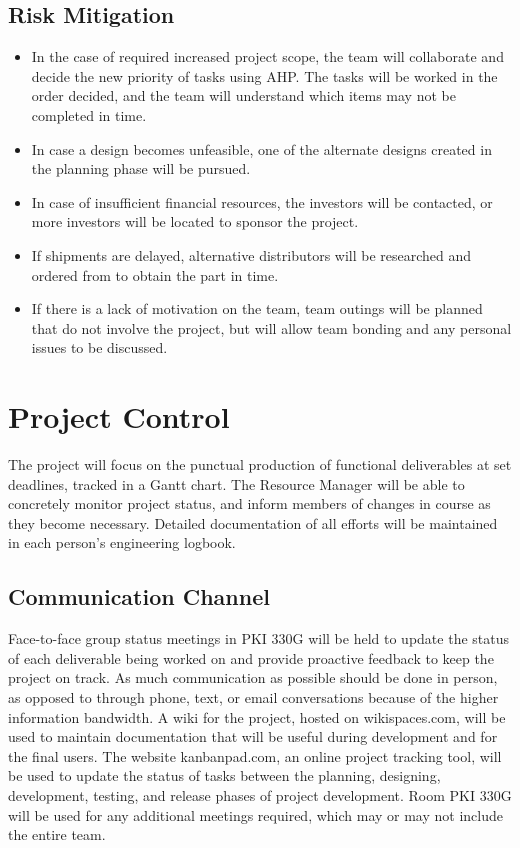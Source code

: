 \subsection{Risk Mitigation}
\begin{itemize}
	\item In the case of required increased project scope, the team will collaborate and decide the new priority of tasks using AHP. The tasks will be worked in the order decided, and the team will understand which items may not be completed in time.
	\item In case a design becomes unfeasible, one of the alternate designs created in the planning phase will be pursued.
	\item In case of insufficient financial resources, the investors will be contacted, or more investors will be located to sponsor the project.
	\item If shipments are delayed, alternative distributors will be researched and ordered from to obtain the part in time.
	\item If there is a lack of motivation on the team, team outings will be planned that do not involve the project, but will allow team bonding and any personal issues to be discussed.
\end{itemize}

\section{Project Control}
The project will focus on the punctual production of functional deliverables at set deadlines, tracked in a Gantt chart.
The Resource Manager will be able to concretely monitor project status, and inform members of changes in course as they become necessary.
Detailed documentation of all efforts will be maintained in each person's engineering logbook.

\subsection{Communication Channel}
Face-to-face group status meetings in PKI 330G will be held to update the status of each deliverable being worked on and provide proactive feedback to keep the project on track.
As much communication as possible should be done in person, as opposed to through phone, text, or email conversations because of the higher information bandwidth.
A wiki for the project, hosted on wikispaces.com, will be used to maintain documentation that will be useful during development and for the final users. 
The website kanbanpad.com, an online project tracking tool, will be used to update the status of tasks between the planning, designing, development, testing, and release phases of project development.
Room PKI 330G will be used for any additional meetings required, which may or may not include the entire team.

